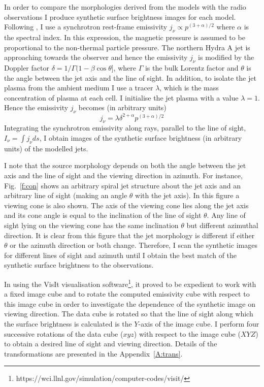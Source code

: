In order to compare the morphologies derived from the models with the radio observations I produce synthetic surface brightness images for each model. Following \citet{sutherland07}, I use a synchrotron rest-frame emissivity $j_\nu \propto p^{(3+\alpha)/2}$ where  $\alpha$ is the spectral index.  In this expression, the magnetic pressure is assumed to be proportional to the non-thermal particle pressure. The northern Hydra A jet is approaching towards the observer and hence the emissivity $j_\nu$ is modified by the Doppler factor $\delta = 1/\Gamma(1 - \beta \cos\theta]$, where $\Gamma$ is the bulk Lorentz factor and $\theta$ is the angle between the jet axis and the line of sight. In addition, to isolate the jet plasma from the ambient medium I use a tracer $\lambda$, which is the mass concentration of plasma at each cell. I initialise the jet plasma with a value $\lambda = 1$. Hence the emissivity $j_\nu$ becomes (in arbitrary units) 
\begin{equation}
j_\nu = \lambda \delta^{2+\alpha}p^{(3+\alpha)/2}
\end{equation}
Integrating the synchrotron emissivity along rays, parallel to the line of sight, $I_\nu = \int j_\nu ds$, I obtain images of the synthetic surface brightness (in arbitrary units) of the modelled jets. 

I note that the source morphology depends on both the angle between the jet axis and the line of sight and the viewing direction in azimuth. For instance, Fig.~\ref{f:con} shows an arbitrary spiral jet structure about the jet axis and an arbitrary line of sight (making an angle $\theta$ with the jet axis). In this figure a viewing cone is also shown. The axis of the viewing cone lies along the jet axis and its cone angle is equal to the inclination of the line of sight $\theta$. Any line of sight lying on the viewing cone has the same inclination $\theta$ but different azimuthal direction. It is clear from this figure that the jet morphology is different if either $\theta$ or the azimuth direction or both change. Therefore, I scan the synthetic images for different lines of sight and azimuth until I obtain the best match of the synthetic surface brightness to the observations. 

In using the VisIt visualisation software\footnote{https://wci.llnl.gov/simulation/computer-codes/visit/}, it proved to be expedient to work with a fixed image cube and to rotate the computed emissivity cube with respect to this image cube in order to investigate the dependence of the synthetic image on viewing direction. The data cube is rotated so that the line of sight along which the surface brightness is calculated is the $Y$-axis of the image cube. I perform four successive rotations of the data cube ($xyz$) with respect to the image cube ($XYZ$) to obtain a desired line of sight and viewing direction. Details of the transformations are presented in the Appendix~\ref{A:trans}. 

